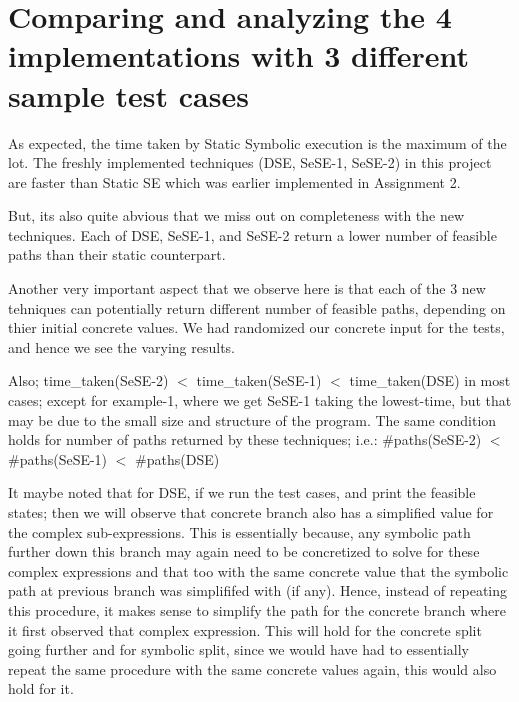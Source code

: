 \documentclass[11pt]{llncs}
\begin{document}
\section{Comparing and analyzing the 4 implementations with 3 different sample test cases} \label{Comparing and analyzing the 3 implementations with some sample test cases}
	\vspace{-2mm}

	As expected, the time taken by Static Symbolic execution is the maximum of the lot. The freshly implemented techniques (DSE, SeSE-1, SeSE-2) in this project are faster than Static SE which was earlier implemented in Assignment 2. 

	\vspace{2mm}

	But, its also quite abvious that we miss out on completeness with the new techniques. Each of DSE, SeSE-1, and SeSE-2 return a lower number of feasible paths than their static counterpart.

	\vspace{2mm}

	Another very important aspect that we observe here is that each of the 3 new tehniques can potentially return different number of feasible paths, depending on thier initial concrete values. We had randomized our concrete input for the tests, and hence we see the varying results.

	\vspace{2mm}

	Also; time\_taken(SeSE-2) $<$  time\_taken(SeSE-1) $<$  time\_taken(DSE) in most cases; except for example-1, where we get SeSE-1 taking the lowest-time, but that may be due to the small size and structure of the program. The same condition holds for number of paths returned by these techniques; i.e.: \#paths(SeSE-2) $<$  \#paths(SeSE-1) $<$ \#paths(DSE)
	
   	 \vspace{2mm}

	It maybe noted that for DSE, if we run the test cases, and print the feasible states; then we will observe that concrete branch also has a simplified value for the complex sub-expressions. This is essentially because, any symbolic path further down this branch may again need to be concretized to solve for these complex expressions and that too with the same concrete value that the symbolic path at previous branch was simplififed with (if any). Hence, instead of repeating this procedure, it makes sense to simplify the path for the concrete branch where it first observed that complex expression. This will hold for the concrete split going further and for symbolic split, since we would have had to essentially repeat the same procedure with the same concrete values again, this would also hold for it.
	
\end{document}
